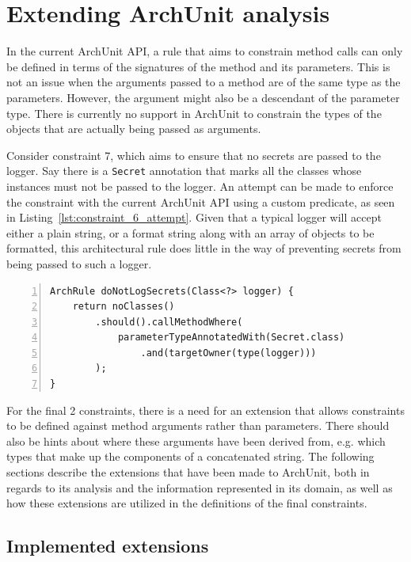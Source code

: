 \section{Extending ArchUnit analysis}

In the current ArchUnit API, a rule that aims to constrain method calls can only be defined in terms of the signatures of the method and its parameters. This is not an issue when the arguments passed to a method are of the same type as the parameters. However, the argument might also be a descendant of the parameter type. There is currently no support in ArchUnit to constrain the types of the objects that are actually being passed as arguments.

Consider constraint 7, which aims to ensure that no secrets are passed to the logger. Say there is a \texttt{Secret} annotation that marks all the classes whose instances must not be passed to the logger. An attempt can be made to enforce the constraint with the current ArchUnit API using a custom predicate, as seen in Listing~\ref{lst:constraint_6_attempt}. Given that a typical logger will accept either a plain string, or a format string along with an array of objects to be formatted, this architectural rule does little in the way of preventing secrets from being passed to such a logger.

\begin{minipage}{\linewidth}
\begin{lstlisting}[caption={A first attempt to implement constraint 7.}, captionpos=b, label=lst:constraint_6_attempt, numbers=left]
ArchRule doNotLogSecrets(Class<?> logger) {
    return noClasses()
        .should().callMethodWhere(
            parameterTypeAnnotatedWith(Secret.class)
                .and(targetOwner(type(logger)))
        );
}
\end{lstlisting}
\end{minipage}

For the final 2 constraints, there is a need for an extension that allows constraints to be defined against method arguments rather than parameters. There should also be hints about where these arguments have been derived from, e.g. which types that make up the components of a concatenated string. The following sections describe the extensions that have been made to ArchUnit, both in regards to its analysis and the information represented in its domain, as well as how these extensions are utilized in the definitions of the final constraints.

\subsection{Implemented extensions}

